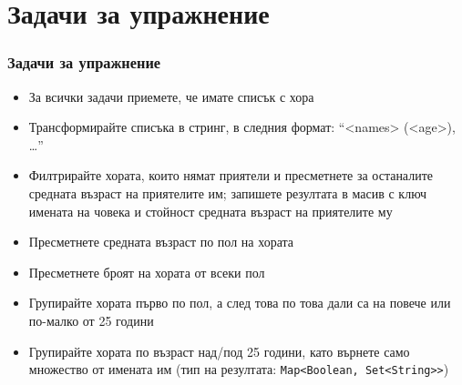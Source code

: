 \documentclass[ignorenonframetext, hyperref=unicode,compress,pdflatex]{beamer}
\begin{document}
\section{Задачи за упражнение}

\begin{frame}[containsverbatim]\frametitle{Задачи за упражнение}
\begin{itemize}
  \item За всички задачи приемете, че имате списък с хора
  \item Трансформирайте списъка в стринг, в следния формат: ``<names> (<age>),
  \ldots''
  \item Филтрирайте хората, които нямат приятели и пресметнете за останалите
  средната възраст на приятелите им; запишете резултата в масив с ключ имената
  на човека и стойност средната възраст на приятелите му
  \item Пресметнете средната възраст по пол на хората
  \item Пресметнете броят на хората от всеки пол
  \item Групирайте хората първо по пол, а след това по това дали са на повече
  или по-малко от 25 години
  \item Групирайте хората по възраст над/под 25 години, като върнете
  само множество от имената им (тип на резултата:
  \lstinline{Map<Boolean, Set<String>>})
\end{itemize}
\end{frame}
\end{document}
